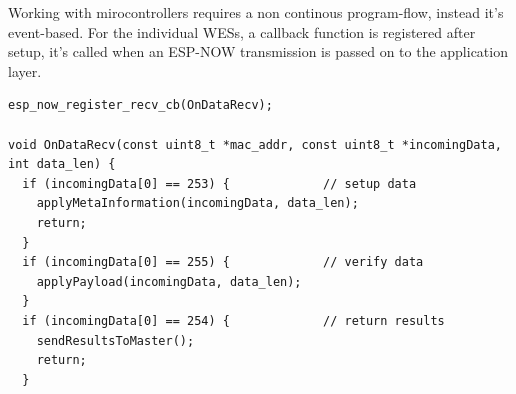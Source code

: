 Working with mirocontrollers requires a non continous program-flow, instead it's event-based.
For the individual WESs, a callback function is registered after setup, 
it's called when an ESP-NOW transmission is passed on to the application layer.

\begin{lstlisting}[caption=ESP-NOW Callback Functions]
esp_now_register_recv_cb(OnDataRecv);

void OnDataRecv(const uint8_t *mac_addr, const uint8_t *incomingData, int data_len) {
  if (incomingData[0] == 253) {             // setup data
    applyMetaInformation(incomingData, data_len);
    return;
  }
  if (incomingData[0] == 255) {             // verify data
    applyPayload(incomingData, data_len);
  }
  if (incomingData[0] == 254) {             // return results
    sendResultsToMaster();
    return;
  }
\end{lstlisting}
\label{lst:callback}
